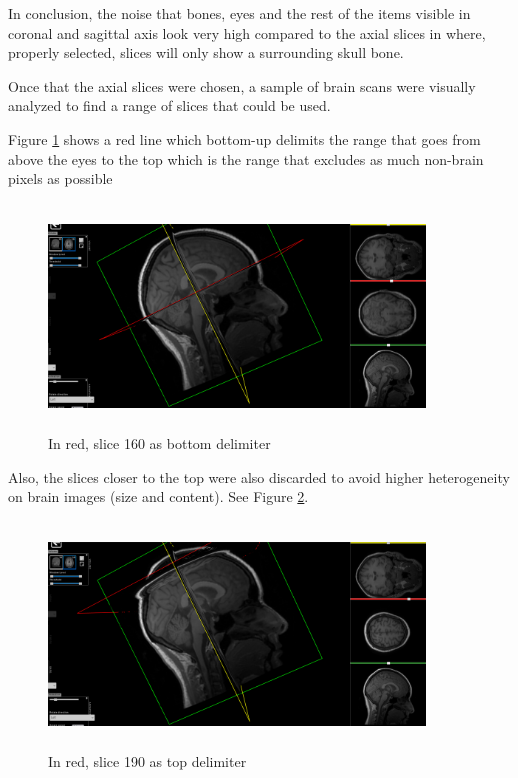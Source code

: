 In conclusion, the noise that bones, eyes and the rest of the items visible in coronal and sagittal axis look very high compared to the axial slices in where, properly selected, slices will only show a surrounding skull bone.

Once that the axial slices were chosen, a sample of brain scans were visually analyzed to find a range of slices that could be used.

Figure \ref*{fig:slice160} shows a red line which bottom-up delimits  the range that goes from above the eyes to the top which is the range that excludes as much non-brain pixels as possible

\begin{figure}[ht]
    \centering
    \includegraphics[width = 10cm, height = 6cm]{images/nifti-slice160.png}
    \caption[Slice 160 as bottom delimiter]{In red, slice 160 as bottom delimiter}
    \label{fig:slice160}
\end{figure}

Also, the slices closer to the top were also discarded to avoid higher heterogeneity on brain images (size and content). See Figure \ref*{fig:slice190}.

\begin{figure}[ht]
    \centering
    \includegraphics[width = 10cm, height = 6cm]{images/nifti-slice190.png}
    \caption[Slice 190 as top delimiter]{In red, slice 190 as top delimiter}
    \label{fig:slice190}
\end{figure}


